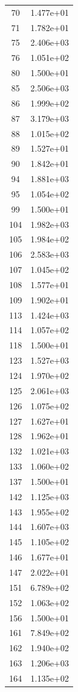 \documentclass[12pt]{article}
\begin{document}
\begin{longtable}{@{}cc@{}}
70 & 1.477e+01 \\
71 & 1.782e+01 \\
75 & 2.406e+03 \\
76 & 1.051e+02 \\
80 & 1.500e+01 \\
85 & 2.506e+03 \\
86 & 1.999e+02 \\
87 & 3.179e+03 \\
88 & 1.015e+02 \\
89 & 1.527e+01 \\
90 & 1.842e+01 \\
94 & 1.881e+03 \\
95 & 1.054e+02 \\
99 & 1.500e+01 \\
104 & 1.982e+03 \\
105 & 1.984e+02 \\
106 & 2.583e+03 \\
107 & 1.045e+02 \\
108 & 1.577e+01 \\
109 & 1.902e+01 \\
113 & 1.424e+03 \\
114 & 1.057e+02 \\
118 & 1.500e+01 \\
123 & 1.527e+03 \\
124 & 1.970e+02 \\
125 & 2.061e+03 \\
126 & 1.075e+02 \\
127 & 1.627e+01 \\
128 & 1.962e+01 \\
132 & 1.021e+03 \\
133 & 1.060e+02 \\
137 & 1.500e+01 \\
142 & 1.125e+03 \\
143 & 1.955e+02 \\
144 & 1.607e+03 \\
145 & 1.105e+02 \\
146 & 1.677e+01 \\
147 & 2.022e+01 \\
151 & 6.789e+02 \\
152 & 1.063e+02 \\
156 & 1.500e+01 \\
161 & 7.849e+02 \\
162 & 1.940e+02 \\
163 & 1.206e+03 \\
164 & 1.135e+02 \\

\end{longtable}
\end{document}
